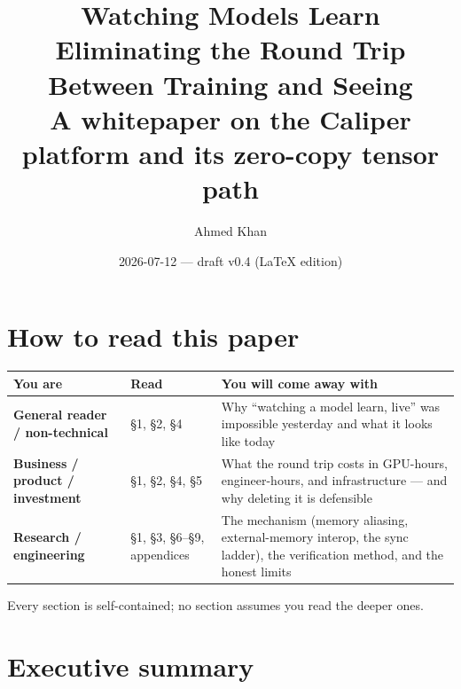 \documentclass[11pt]{article}
\title{\textbf{Watching Models Learn}\\[3pt]
\large Eliminating the Round Trip Between Training and Seeing\\[5pt]
\normalsize A whitepaper on the Caliper platform and its zero-copy tensor path}
\author{Ahmed Khan}
\date{2026-07-12 --- draft v0.4 (\LaTeX{} edition)}
\begin{document}
\maketitle

\begin{center}
\end{center}

\section*{How to read this paper}

\begin{center}\small
\begin{tabular}{@{}p{}p{}p{}@{}}
\toprule
You are & Read & You will come away with \\
\midrule
\textbf{General reader / non-technical} & \S1, \S2, \S4 &
  Why ``watching a model learn, live'' was impossible yesterday and what it
  looks like today \\
\addlinespace
\textbf{Business / product / investment} & \S1, \S2, \S4, \S5 &
  What the round trip costs in GPU-hours, engineer-hours, and infrastructure
  --- and why deleting it is defensible \\
\addlinespace
\textbf{Research / engineering} & \S1, \S3, \S6--\S9, appendices &
  The mechanism (memory aliasing, external-memory interop, the sync ladder),
  the verification method, and the honest limits \\
\bottomrule
\end{tabular}
\end{center}

\noindent
Every section is self-contained; no section assumes you read the deeper ones.

\section{Executive summary}
\end{document}
